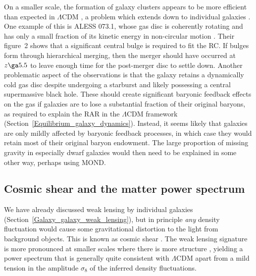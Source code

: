 \documentclass[fleqn,usenatbib,useAMS,onecolumn]{mnras} %
\begin{document}
On a smaller scale, the formation of galaxy clusters appears to be more efficient than expected in $\Lambda$CDM \citep{Capak_2011, Cucciati_2018, Champagne_2021, McConachie_2022}, a problem which extends down to individual galaxies \citep{Steinhardt_2016, Marrone_2018, Wang_2019, Rennehan_2020, Neeleman_2020, Tsukui_2021}. One example of this is ALESS 073.1, whose gas disc is coherently rotating and has only a small fraction of its kinetic energy in non-circular motion \citep{Lelli_2021}. Their figure~2 shows that a significant central bulge is required to fit the RC. If bulges form through hierarchical merging, then the merger should have occurred at $z \ga 5.5$ to leave enough time for the post-merger disc to settle down. Another problematic aspect of the observations is that the galaxy retains a dynamically cold gas disc despite undergoing a starburst and likely possessing a central supermassive black hole. These should create significant baryonic feedback effects on the gas if galaxies are to lose a substantial fraction of their original baryons, as required to explain the RAR in the $\Lambda$CDM framework (Section~\ref{Equilibrium_galaxy_dynamics}). Instead, it seems likely that galaxies are only mildly affected by baryonic feedback processes, in which case they would retain most of their original baryon endowment. The large proportion of missing gravity in especially dwarf galaxies would then need to be explained in some other way, perhaps using MOND.



\subsection{Cosmic shear and the matter power spectrum}
\label{Cosmic_shear}

We have already discussed weak lensing by individual galaxies (Section~\ref{Galaxy_galaxy_weak_lensing}), but in principle \emph{any} density fluctuation would cause some gravitational distortion to the light from background objects. This is known as cosmic shear \citep[for a review, see][]{Kilbinger_2015}. The weak lensing signature is more pronounced at smaller scales where there is more structure \citep{DES_2018}, yielding a power spectrum that is generally quite consistent with $\Lambda$CDM apart from a mild tension in the amplitude $\sigma_8$ of the inferred density fluctuations.
\end{document}
